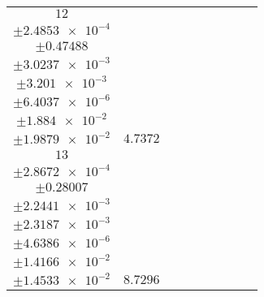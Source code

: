 \documentclass[8pt]{article}
\begin{document}
\begin{longtable}[l]{c c c c c c c c c}
$\num{12}$ & \begin{tabular}[c]{@{}c@{}}$\num{3.0265e-2}$ \\ $\pm\num{2.4853e-4}$\end{tabular} & \begin{tabular}[c]{@{}c@{}}$\num{-0.16123}$ \\ $\pm\num{0.47488}$\end{tabular} & \begin{tabular}[c]{@{}c@{}}$\num{0.90894}$ \\ $\pm\num{3.0237e-3}$\end{tabular} & \begin{tabular}[c]{@{}c@{}}$\num{2.1443e+3}$ \\ $\pm\num{3.201e-3}$\end{tabular} & \begin{tabular}[c]{@{}c@{}}$\num{4.2898}$ \\ $\pm\num{6.4037e-6}$\end{tabular} & \begin{tabular}[c]{@{}c@{}}$\num{2.0516}$ \\ $\pm\num{1.884e-2}$\end{tabular} & \begin{tabular}[c]{@{}c@{}}$\num{2.1198}$ \\ $\pm\num{1.9879e-2}$\end{tabular} & $\num{4.7372}$\\
$\num{13}$ & \begin{tabular}[c]{@{}c@{}}$\num{5.8587e-2}$ \\ $\pm\num{2.8672e-4}$\end{tabular} & \begin{tabular}[c]{@{}c@{}}$\num{-0.70953}$ \\ $\pm\num{0.28007}$\end{tabular} & \begin{tabular}[c]{@{}c@{}}$\num{4.2176}$ \\ $\pm\num{2.2441e-3}$\end{tabular} & \begin{tabular}[c]{@{}c@{}}$\num{2.1476e+3}$ \\ $\pm\num{2.3187e-3}$\end{tabular} & \begin{tabular}[c]{@{}c@{}}$\num{4.2964}$ \\ $\pm\num{4.6386e-6}$\end{tabular} & \begin{tabular}[c]{@{}c@{}}$\num{2.5}$ \\ $\pm\num{1.4166e-2}$\end{tabular} & \begin{tabular}[c]{@{}c@{}}$\num{2.5533}$ \\ $\pm\num{1.4533e-2}$\end{tabular} & $\num{8.7296}$\\

\end{longtable}
\end{document}
